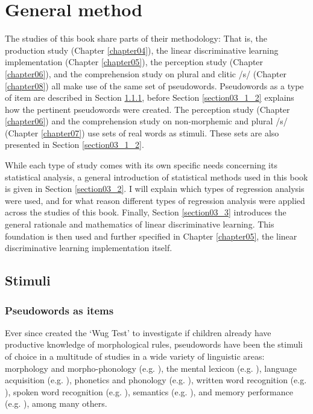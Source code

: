 \chapter{General method}\label{chapter03}

The studies of this book share parts of their methodology: That is, the production study (Chapter \ref{chapter04}), the linear discriminative learning implementation (Chapter \ref{chapter05}), the perception study (Chapter \ref{chapter06}), and the comprehension study on plural and clitic /s/ (Chapter \ref{chapter08}) all make use of the same set of pseudowords. Pseudowords as a type of item are described in Section \ref{section03_1_1}, before Section \ref{section03_1_2} explains how the pertinent pseudowords were created. The perception study (Chapter \ref{chapter06}) and the comprehension study on non-morphemic and plural /s/ (Chapter \ref{chapter07}) use sets of real words as stimuli. These sets are also presented in Section \ref{section03_1_2}.

While each type of study comes with its own specific needs concerning its statistical analysis, a general introduction of statistical methods used in this book is given in Section \ref{section03_2}. I will explain which types of regression analysis were used, and for what reason different types of regression analysis were applied across the studies of this book.
Finally, Section \ref{section03_3} introduces the general rationale and mathematics of linear discriminative learning. This foundation is then used and further specified in Chapter \ref{chapter05}, the linear discriminative learning implementation itself.

\section{Stimuli}\label{section03_1}

\subsection{Pseudowords as items}\label{section03_1_1}

Ever since \citet{Berko1958} created the `Wug Test’ to investigate if children already have productive knowledge of morphological rules, pseudowords have been the stimuli of choice in a multitude of studies in a wide variety of linguistic areas: morphology and morpho-phonology (e.g. \cite{Albright2002, Albright2003, Pierrehumbert2006, Dabrowska2008, Kraemer2009, Kawahara2012, Gouskova2013}), the mental lexicon (e.g. \cite{Rubenstein1970, Anshen1988, Prasada1993, Vitevitch1998, Eddington2000, Shatzman2006pseudo, Meunier2007}), language acquisition (e.g. \cite{Dollaghan1985, Singson2000, Friedrich2005, Vijver2014}), phonetics and phonology (e.g. \cite{Turcsan2015, Schmitz2018}), written word recognition (e.g. \cite{Burani1999, McKay2008}), spoken word recognition (e.g. \cite{Marslen1984}), semantics (e.g. \cite{Ozubko2011}), and memory performance (e.g. \cite{Hulme1995}), among many others.

